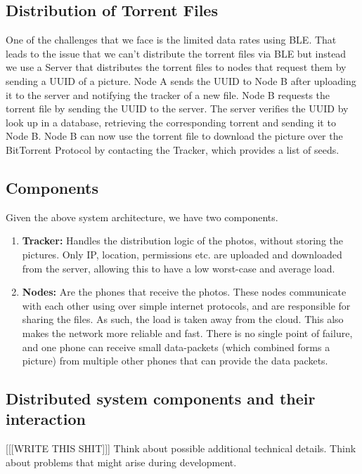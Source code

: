 \documentclass{report}
\begin{document}
\subsection{Distribution of Torrent Files}
One of the challenges that we face is the limited data rates using BLE.
That leads to the issue that we can't distribute the torrent files via BLE but instead we use a Server that distributes the torrent files to nodes that request them by sending a UUID of a picture. \newline
Node A sends the UUID to Node B after uploading it to the server and notifying the tracker of a new file. 
Node B requests the torrent file by sending the UUID to the server.
The server verifies the UUID by look up in a database, retrieving the corresponding torrent and sending it to Node B. Node B can now use the torrent file to download the picture over the BitTorrent Protocol by contacting the Tracker, which provides a list of seeds.

\subsection{Components}
Given the above system architecture, we have two components. 

\begin{enumerate}
\item \textbf{Tracker:} Handles the distribution logic of the photos, without storing the pictures. 
Only IP, location, permissions etc. are uploaded and downloaded from the server, allowing this to have a low worst-case and average load. 
\item \textbf{Nodes:} Are the phones that receive the photos. 
These nodes communicate with each other using over simple internet protocols, and are responsible for sharing the files. As such, the load is taken away from the cloud. 
This also makes the network more reliable and fast. There is no single point of failure, and one phone can receive small data-packets (which combined forms a picture) from multiple other phones that can provide the data packets.
\end{enumerate}

\subsection{Distributed system components and their interaction}
[[[WRITE THIS SHIT]]]
Think about possible additional technical details.
Think about problems that might arise during development.
\end{document}
